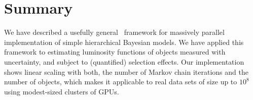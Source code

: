 \section{Summary}
\label{sec:summary}

We have described a usefully general \Cpp\ framework for massively parallel implementation of simple hierarchical Bayesian models.
We have applied this framework to estimating luminosity functions of objects measured with uncertainty, and subject to (quantified) selection effects.
Our implementation shows linear scaling with both, the number of Markov chain iterations and the number of objects, which makes it applicable to real data sets of size up to $10^{8}$ using modest-sized clusters of GPUs.

